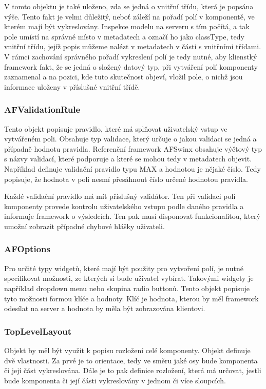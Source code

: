V tomto objektu je také uloženo, zda se jedná o vnitřní třídu, která je popsána výše. Tento fakt je velmi důležitý, neboť záleží na pořadí polí v komponentě, ve kterém mají být vykreslovány. Inspekce modelu na serveru s tím počítá, a tak pole umístí na správné místo v metadatech a označí ho jako classType, tedy vnitřní třídu, jejíž popis můžeme nalézt v metadatech v části s vnitřními třídami. V rámci zachování správného pořadí vykreslení polí je tedy nutné, aby klienstký framework fakt, že se jedná o složený datový typ, při vytváření polí komponenty zaznamenal a na pozici, kde tuto skutečnost objeví, vložil pole, o nichž jsou informace uloženy v příslušné vnitřní třídě.

\subsubsection{AFValidationRule}
Tento objekt popisuje pravidlo, které má splňovat uživatelský vstup ve vytvářeném poli. Obsahuje typ validace, který určuje o jakou validaci se jedná a případně hodnotu pravidla. Referenční framework AFSwinx obsahuje výčtový typ s názvy validací, které podporuje a které se mohou tedy v metadatech objevit. Například definuje validační pravidlo typu MAX a hodnotou je nějaké číslo. Tedy popisuje, že hodnota v poli nesmí přesáhnout číslo určené hodnotou pravidla. 

Každé validační pravidlo má mít příslušný validátor. Ten při validaci polí komponenty provede kontrolu uživatelského vstupu podle daného pravidla a informuje framework o výsledcích. Ten pak musí disponovat funkcionalitou, který umožní zobrazit případné chybové hlášky uživateli. 

\subsubsection{AFOptions}
Pro určité typy widgetů, které mají být použity pro vytvoření polí, je nutné specifikovat možnosti, ze kterých si bude uživatel vybírat. Takovými widgety je například dropdown menu nebo skupina radio buttonů. Tento objekt popisuje tyto možnosti formou klíče a hodnoty. Klíč je hodnota, kterou by měl framework odesílat na server a hodnota by měla být zobrazována klientovi.

\subsubsection{TopLevelLayout}
Objekt by měl být využit k popisu rozložení celé komponenty. Objekt definuje dvě vlastnosti. Za prvé je to orientace, tedy ve směru jaké osy bude komponenta či její část vykreslována. Dále je to pak definice rozložení, která má určovat, jestli bude komponenta či její části vykreslovány v jednom či více sloupcích. 

